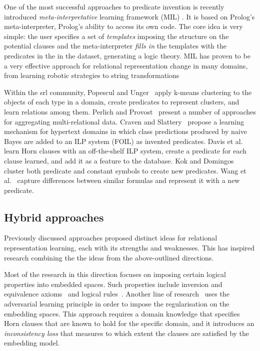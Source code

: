 One of the most successful approaches to predicate invention is recently introduced \textit{meta-interpretative} learning framework (MIL) \cite{MuggletonMIL,Cropper2018,Cropper:2015}.
It is based on Prolog's meta-interpreter, Prolog's ability to access its own code.
The core idea is very simple: the user specifies a set of \textit{templates} imposing the structure on the potential clauses and the meta-interpreter \textit{fills in} the templates with the predicates in the in the dataset, generating a logic theory.
MIL has proven to be a very effective approach for relational representation change in many domains, from learning robotic strategies to string transformations \cite{Cropper2015LearningEL,DBLP:journals/ml/MuggletonDSTWZ18,DBLP:conf/ilp/CropperTM15}



Within the \gls{srl} community,  Popescul and Unger~\cite{Popescul2004} apply k-means clustering to the objects of each type in a domain, create predicates to represent clusters, and learn relations among them.
Perlich and Provost~\cite{Perlich2003} present a number of approaches for aggregating multi-relational data.
Craven and Slattery~\cite{Craven2001} propose a learning mechanism for hypertext domains in which class predictions produced by naive Bayes are added to an ILP system (FOIL) as invented predicates.
Davis et al.~\cite{DavisOSBPC07} learn Horn clauses with an off-the-shelf ILP system, create a predicate for each clause learned, and add it as a feature to the database.
Kok and Domingos~\cite{Kok2007} cluster both predicate and constant symbols to create new predicates.
Wang et al.~\cite{WangMC15} capture differences between similar formulas and represent it with a new predicate.



\subsection{Hybrid approaches}


Previously discussed approaches proposed distinct ideas for relational representation learning, each with its strengths and weaknesses.
This has inspired research combining the the ideas from the above-outlined directions.


Most of the research in this direction focuses on imposing certain logical properties into embedded spaces.
Such properties include inversion and equivalence axioms~\cite{DBLP:conf/pkdd/MinerviniCMNV17} and logical rules~\cite{demeester2016lifted,N15-1118,W14-2409}.
Another line of research~\cite{DBLP:conf/uai/MinerviniDRR17} uses the adversarial learning principle in order to impose the regularisation on the embedding spaces.
This approach requires a domain knowledge that specifies Horn clauses that are known to hold for the specific domain, and it introduces an \textit{inconsistency loss} that measures to which extent the clauses are satisfied by the embedding model.



